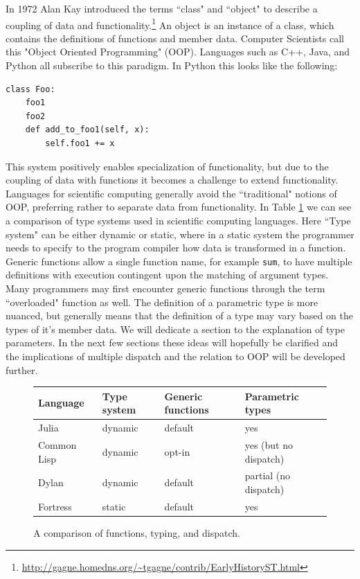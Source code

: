In 1972 Alan Kay introduced the terms
``class" and ``object" to describe a coupling of data and functionality.\footnote{\url{http://gagne.homedns.org/~tgagne/contrib/EarlyHistoryST.html}}
An object is an instance of a class, which contains the definitions of 
functions and member data. Computer Scientists
call this "Object Oriented Programming" (OOP).
Languages such as C++, Java, and Python all subscribe to this paradigm.
In Python this looks like the following:
\begin{lstlisting}
class Foo:
    foo1
    foo2
    def add_to_foo1(self, x):
        self.foo1 += x
\end{lstlisting}

This system positively enables specialization of functionality, but due
to the coupling of data with functions it becomes a challenge to extend
functionality. Languages for scientific computing generally avoid the
``traditional" notions
of OOP, preferring rather to separate data from
functionality. In Table \ref{tab:types} we can see a
comparison of type systems used in scientific computing languages. Here ``Type
system" can be either dynamic or static, where in a static system the programmer
needs to specify to the program compiler how data is transformed in a function.
Generic functions allow a single function name, for example \texttt{sum}, to have
multiple definitions with execution contingent upon the matching of argument
types. Many programmers may first encounter generic functions through the
term ``overloaded" function as well.
The definition of a parametric type is more nuanced, but generally
means that the definition of a type may vary based on the types of it's
member data. We will dedicate a section to the explanation of type parameters.
In the next
few sections these ideas will hopefully be clarified and the implications of
multiple dispatch and the relation to OOP will be developed further.


\begin{figure}[h!]
  \centering
    \caption{A comparison of functions, typing, and dispatch.}
    \begin{tabular}{ l | l l l}
    Language & Type system & Generic functions & Parametric types \\
    \hline
    Julia & dynamic & default & yes \\
    Common Lisp & dynamic & opt-in & yes (but no dispatch) \\
    Dylan & dynamic & default & partial (no dispatch) \\
    Fortress & static & default & yes \\
    \end{tabular}
  \label{tab:types}
\end{figure}


